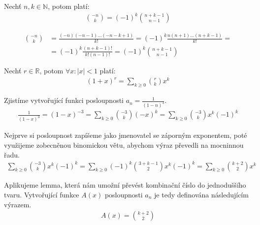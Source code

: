 \begin{t_lemma}
  Nechť $n,k\in\mathbb{N}$, potom platí:
  \begin{align*}
    \binom{-n}{k}=(-1)^k\binom{n+k-1}{n-1}
  \end{align*}
\end{t_lemma}

\begin{t_proof}
  \begin{align*}
    \binom{-n}{k}&=\frac{(-n)(-n-1)\dots(-n-k+1)}{k!}=
    (-1)^k\frac{n(n+1)\dots(n+k-1)}{k!}=\\
    &=(-1)^k\frac{(n+k-1)!}{k!(n-1)!}=(-1)^k\binom{n+k-1}{n-1}
  \end{align*}
\end{t_proof}

\begin{t_fact}
  Nechť $r\in\mathbb{R}$, potom $\forall x :|x|<1$ platí:
  \begin{align*}
    (1+x)^r=\sum_{k\geq 0}\binom{r}{k}x^k
  \end{align*}
\end{t_fact}

\begin{t_example}
  Zjistíme vytvořující funkci posloupnosti $a_n=\frac{1}{(1-n)^3}$.
  \begin{align*}
    \frac{1}{(1-x)^3}=(1-x)^{-3}
    =\sum_{k\geq 0}\binom{-3}{k}(-x)^k
    =\sum_{k\geq 0}\binom{-3}{k}x^k(-1)^k
  \end{align*}
  
  Nejprve si posloupnost zapíšeme jako jmenovatel se záporným exponentem, poté využijeme zobecněnou binomickou větu, abychom výraz převedli na mocninnou řadu.
  \begin{align*}
    \sum_{k\geq 0}\binom{-3}{k}x^k(-1)^k
    =\sum_{k\geq 0}(-1)^k\binom{3+k-1}{2}x^k(-1)^k
    =\sum_{k\geq 0}\binom{k+2}{2}x^k
  \end{align*}
  
  Aplikujeme lemma, která nám umožní převést kombinační číslo do jednoduššího tvaru. Vytvořující funkce $A(x)$ posloupnosti $a_n$ je tedy definována následujícím výrazem. 
  \begin{align*}
    A(x)=\binom{k+2}{2}
  \end{align*}
\end{t_example}

